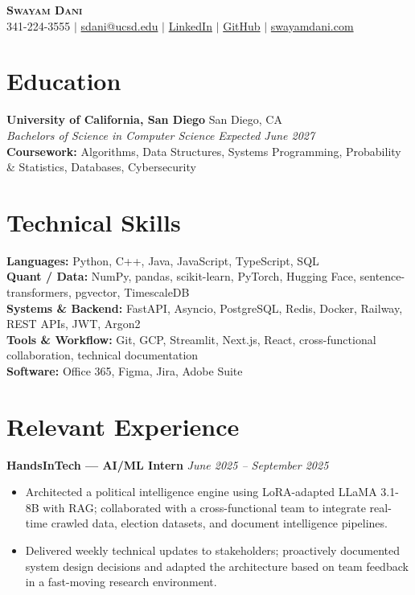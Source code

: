 \documentclass[10.5pt]{article}
\newcommand{\blist}{\begin{itemize}[leftmargin=*,noitemsep,topsep=1pt,parsep=0pt,itemsep=1pt]}
\newcommand{\elist}{\end{itemize}\vspace{3pt}}
\begin{document}
\begin{center}
    {\huge\textbf{\scshape Swayam Dani}} \\[1pt]
    \small
    341-224-3555 $|$
    \href{mailto:sdani@ucsd.edu}{sdani@ucsd.edu} $|$
    \href{https://www.linkedin.com/in/swayam-dani}{LinkedIn} $|$
    \href{https://github.com/swayamdani}{GitHub} $|$
    \href{https://www.swayamdani.com}{swayamdani.com}
\end{center}
\vspace{-4pt}

\section*{Education}
\textbf{University of California, San Diego} \hfill San Diego, CA \\
\textit{Bachelors of Science in Computer Science} \hfill \textit{Expected June 2027} \\[-2pt]
\small \textbf{Coursework:} Algorithms, Data Structures, Systems Programming, Probability \& Statistics, Databases, Cybersecurity
 

\section*{Technical Skills}
\small
\textbf{Languages:} Python, C++, Java, JavaScript, TypeScript, SQL \\[-1pt]
\textbf{Quant / Data:} NumPy, pandas, scikit-learn, PyTorch, Hugging Face, sentence-transformers, pgvector, TimescaleDB \\[-1pt]
\textbf{Systems \& Backend:} FastAPI, Asyncio, PostgreSQL, Redis, Docker, Railway, REST APIs, JWT, Argon2 \\[-1pt]
\textbf{Tools \& Workflow:} Git, GCP, Streamlit, Next.js, React, cross-functional collaboration, technical documentation \\
\textbf{Software:} Office 365, Figma, Jira, Adobe Suite 

\section*{Relevant Experience}
\small

\textbf{HandsInTech --- AI/ML Intern} \hfill \textit{June 2025 -- September 2025}
\blist
    \item Architected a political intelligence engine using LoRA-adapted LLaMA 3.1-8B with RAG; collaborated with a cross-functional team to integrate real-time crawled data, election datasets, and document intelligence pipelines.
    \item Delivered weekly technical updates to stakeholders; proactively documented system design decisions and adapted the architecture based on team feedback in a fast-moving research environment.
\elist
\end{document}
